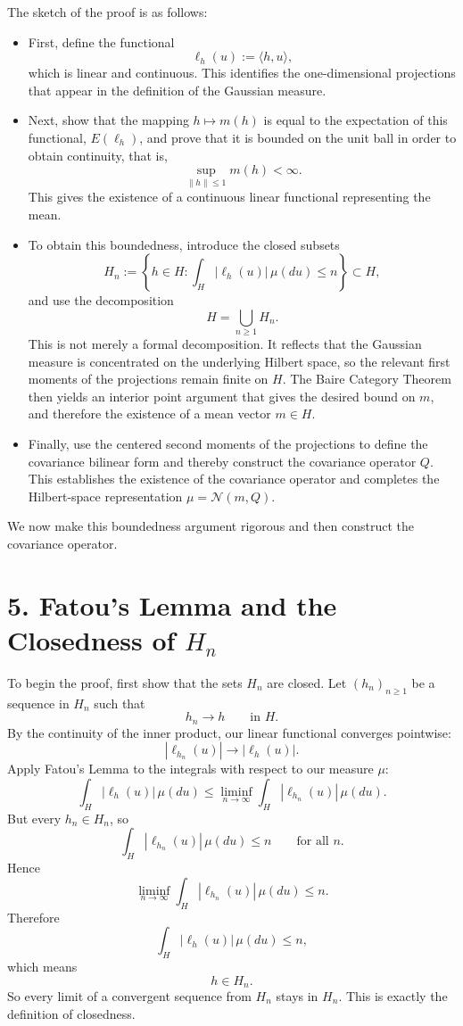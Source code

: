 \documentclass[11pt]{article}
\theoremstyle{definition}
\theoremstyle{remark}
\begin{document}
The sketch of the proof is as follows:
\begin{itemize}
\item First, define the functional
\[
\ell_h(u):=\langle h,u\rangle,
\]
which is linear and continuous. This identifies the one-dimensional projections that appear in the definition of the Gaussian measure.

\item Next, show that the mapping \(h\mapsto m(h)\) is equal to the expectation of this functional, \(E(\ell_h)\), and prove that it is bounded on the unit ball in order to obtain continuity, that is,
\[
\sup_{\|h\|\le 1} m(h)<\infty.
\]
This gives the existence of a continuous linear functional representing the mean.

\item To obtain this boundedness, introduce the closed subsets
\[
H_n:=\left\{h\in H:\int_H |\ell_h(u)|\,\mu(du)\le n\right\}\subset H,
\]
and use the decomposition
\[
H=\bigcup_{n\ge 1} H_n.
\]
This is not merely a formal decomposition. It reflects that the Gaussian measure is concentrated on the underlying Hilbert space, so the relevant first moments of the projections remain finite on \(H\).
The Baire Category Theorem then yields an interior point argument that gives the desired bound on \(m\), and therefore the existence of a mean vector \(m\in H\).

\item Finally, use the centered second moments of the projections to define the covariance bilinear form and thereby construct the covariance operator \(Q\). This establishes the existence of the covariance operator and completes the Hilbert-space representation \(\mu=\mathcal N(m,Q)\).
\end{itemize}

We now make this boundedness argument rigorous and then construct the covariance operator.

\section*{5. Fatou's Lemma and the Closedness of $H_n$}
To begin the proof, first show that the sets $H_n$ are closed. Let $(h_n)_{n\ge 1}$ be a sequence in $H_n$ such that
\[
h_n\to h
\qquad \text{in } H.
\]
By the continuity of the inner product, our linear functional converges pointwise:
\[
|\ell_{h_n}(u)|\to |\ell_h(u)|.
\]
Apply Fatou's Lemma to the integrals with respect to our measure $\mu$:
\[
\int_H |\ell_h(u)|\,\mu(du)\le \liminf_{n\to\infty}\int_H |\ell_{h_n}(u)|\,\mu(du).
\]
But every $h_n\in H_n$, so
\[
\int_H |\ell_{h_n}(u)|\,\mu(du)\le n
\qquad \text{for all } n.
\]
Hence
\[
\liminf_{n\to\infty}\int_H |\ell_{h_n}(u)|\,\mu(du)\le n.
\]
Therefore
\[
\int_H |\ell_h(u)|\,\mu(du)\le n,
\]
which means
\[
h\in H_n.
\]
So every limit of a convergent sequence from $H_n$ stays in $H_n$. This is exactly the definition of closedness.
\end{document}
